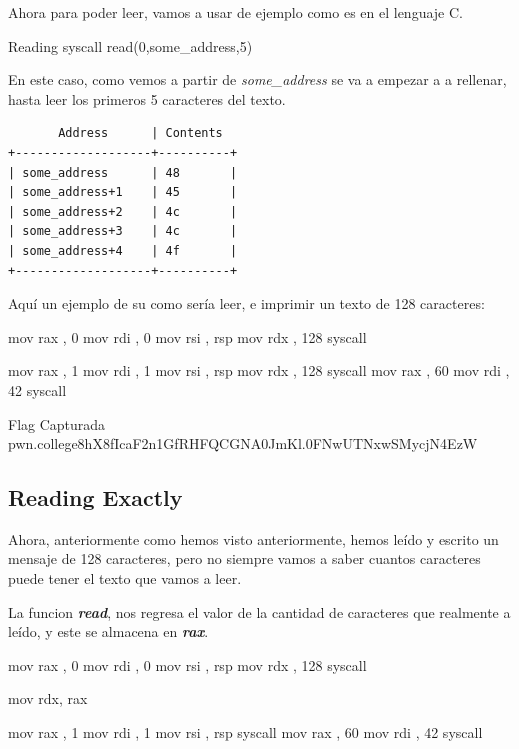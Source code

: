 Ahora para poder leer, vamos a usar de ejemplo como es en el lenguaje C.

\begin{codebox}[C]{Reading syscall}
	read(0,some_address,5)
\end{codebox}

En este caso, como vemos a partir de \textit{some\_address} se va a empezar a
a rellenar, hasta leer los primeros 5 caracteres del texto.

\begin{verbatim}
       Address      | Contents
+-------------------+----------+
| some_address      | 48       |
| some_address+1    | 45       |
| some_address+2    | 4c       |
| some_address+3    | 4c       |
| some_address+4    | 4f       |
+-------------------+----------+
\end{verbatim}
Aquí un ejemplo de su como sería leer, e imprimir un texto de 128 caracteres:
\begin{codebox}[ASM]{}
	mov rax , 0
	mov rdi , 0
	mov rsi , rsp
	mov rdx , 128
	syscall

	mov rax , 1
	mov rdi , 1
	mov rsi , rsp
	mov rdx , 128
	syscall
	mov rax , 60
	mov rdi , 42
	syscall
\end{codebox}

\begin{flagbox}{Flag Capturada}
	pwn.college{8hX8fIcaF2n1GfRHFQCGNA0JmKl.0FNwUTNxwSMycjN4EzW}
\end{flagbox}

\subsection{Reading Exactly}\label{subsec:reading_exactly}

Ahora, anteriormente como hemos visto anteriormente, hemos leído y escrito
un mensaje de 128 caracteres, pero no siempre vamos a saber cuantos caracteres
puede tener el texto que vamos a leer.

La funcion \textit{\textbf{read}}, nos regresa el valor de la cantidad de
caracteres que realmente a leído, y este se almacena en \textit{\textbf{rax}}.

\begin{codebox}[ASM]{}
	mov rax , 0
	mov rdi , 0
	mov rsi , rsp
	mov rdx , 128
	syscall

	mov rdx, rax

	mov rax , 1
	mov rdi , 1
	mov rsi , rsp
	syscall
	mov rax , 60
	mov rdi , 42
	syscall
\end{codebox}

